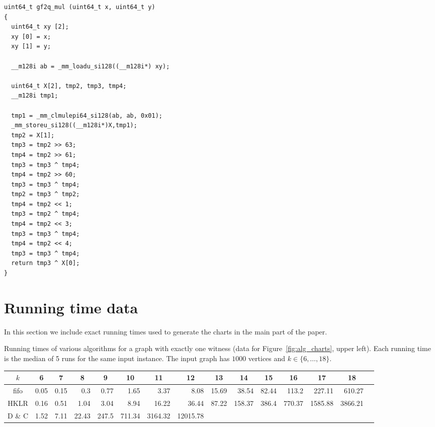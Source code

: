 \documentclass[11pt]{article}
\begin{document}
 {\footnotesize
 \begin{verbatim}
uint64_t gf2q_mul (uint64_t x, uint64_t y)
{
  uint64_t xy [2];
  xy [0] = x;
  xy [1] = y;

  __m128i ab = _mm_loadu_si128((__m128i*) xy);

  uint64_t X[2], tmp2, tmp3, tmp4;
  __m128i tmp1;
  
  tmp1 = _mm_clmulepi64_si128(ab, ab, 0x01);
  _mm_storeu_si128((__m128i*)X,tmp1);
  tmp2 = X[1];
  tmp3 = tmp2 >> 63;
  tmp4 = tmp2 >> 61;
  tmp3 = tmp3 ^ tmp4;
  tmp4 = tmp2 >> 60;
  tmp3 = tmp3 ^ tmp4;
  tmp2 = tmp3 ^ tmp2; 
  tmp4 = tmp2 << 1;
  tmp3 = tmp2 ^ tmp4;
  tmp4 = tmp2 << 3;
  tmp3 = tmp3 ^ tmp4;
  tmp4 = tmp2 << 4;
  tmp3 = tmp3 ^ tmp4;
  return tmp3 ^ X[0];
}
\end{verbatim}
}

          
\section{Running time data}

In this section we include exact running times used to generate the charts in the main part of the paper.

Running times of various algorithms for a graph with exactly one witness (data for Figure~\ref{fig:alg_charts}, upper left).
Each running time is the median of 5 runs for the same input instance.
The input graph has $1000$ vertices and $k\in\{6,\ldots,18\}$.

{\scriptsize
\begin{center}
\begin{tabular}{|c|r@{\,}|r@{\,}|r@{\,}|r@{\,}|r@{\,}|r@{\,}|r@{\,}|r@{\,}|r@{\,}|r@{\,}|r@{\,}|r@{\,}|r@{\,}|r|}\hline
\multicolumn{1}{|c|}{$k$} & \multicolumn{1}{|c|}{6}  & \multicolumn{1}{|c|}{7}  & \multicolumn{1}{|c|}{8}  & \multicolumn{1}{|c|}{9}  & \multicolumn{1}{|c|}{10}  & \multicolumn{1}{|c|}{11}  & \multicolumn{1}{|c|}{12}  & \multicolumn{1}{|c|}{13}  & \multicolumn{1}{|c|}{14}  & \multicolumn{1}{|c|}{15}  & \multicolumn{1}{|c|}{16}  & \multicolumn{1}{|c|}{17}  & \multicolumn{1}{|c|}{18} \\ \hline
fifo & 0.05 & 0.15 & 0.3 & 0.77 & 1.65 & 3.37 & 8.08 & 15.69 & 38.54 & 82.44 & 113.2 & 227.11 & 610.27\\
HKLR & 0.16 & 0.51 & 1.04 & 3.04 & 8.94 & 16.22 & 36.44 & 87.22 & 158.37 & 386.4 & 770.37 & 1585.88 & 3866.21\\
D \& C & 1.52 & 7.11 & 22.43 & 247.5 & 711.34 & 3164.32 & 12015.78 & & & & & & \\\hline
\end{tabular}
\end{center}
}
\end{document}
